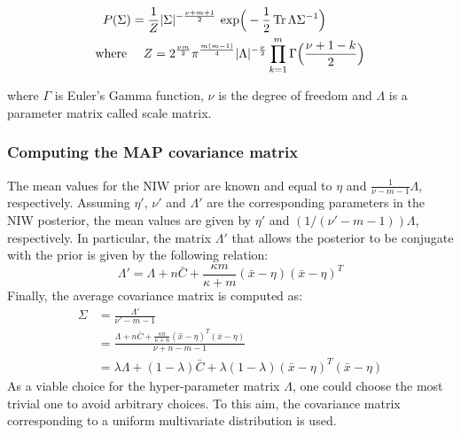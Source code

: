             \begin{equation}
                \begin{split}
                    P(\Sigma) & = \frac{1}{Z} \vert\Sigma\vert^{-\frac{\nu + m + 1}{2}} \text{ exp}\Big(-\frac{1}{2} \operatorname{Tr}{\Lambda \Sigma^{-1}}\Big) \\
                    \text{where } & \quad Z = 2^{\frac {\nu m}{2}} \pi^{\frac{m (m - 1)}{4}} \vert\Lambda\vert^{-\frac \nu2}
                    \prod\limits_{k=1}^{m} \Gamma\Big(\frac{\nu + 1 - k}{2}\Big)
                \end{split}
            \end{equation}

            where $\Gamma$ is Euler's Gamma function, $\nu$ is the degree of freedom and $\Lambda$ is a parameter matrix called scale matrix.

        \subsubsection{Computing the MAP covariance matrix}

            The mean values for the NIW prior are known and equal to $\eta$ and $\frac{1}{\nu - m - 1} \Lambda$, respectively.
            Assuming $\eta'$, $\nu'$ and $\Lambda'$ are the corresponding parameters in the NIW posterior, the mean values are given by
            $\eta'$ and $(1 / (\nu' - m - 1)) \Lambda$, respectively.
            In particular, the matrix $\Lambda'$ that allows the posterior to be conjugate
            with the prior is given by the following relation:
            \begin{equation}
                \Lambda' = \Lambda + n \bar{C} + \frac{\kappa m}{\kappa + m} (\bar{x} - \eta) (\bar{x} - \eta)^T
            \end{equation}
            Finally, the average covariance matrix is computed as:
            \begin{align*}
                \Sigma & = \frac{\Lambda'}{\nu' - m - 1} \\
                & = \frac{\Lambda + n \bar{C} + \frac{\kappa n}{\kappa + n} (\hat{x} - \eta)^T (\bar{x} - \eta)}{\nu + n - m -1} \\
                & = \lambda \Lambda + (1 - \lambda) \bar{C} + \lambda (1 - \lambda) (\bar{x} - \eta)^T (\bar{x} - \eta)
            \end{align*}
            As a viable choice for the hyper-parameter matrix $\Lambda$, one could choose the most trivial one to avoid
            arbitrary choices. To this aim, the covariance
            matrix corresponding to a uniform multivariate distribution is used.
